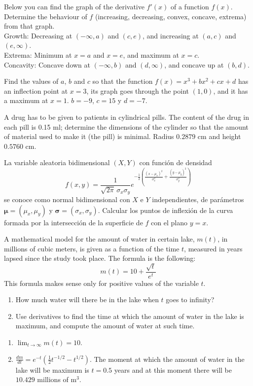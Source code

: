 
{ Below you can find the graph of the derivative $f'(x)$ of a function $f(x)$.
Determine the behaviour of $f$ (increasing, decreasing, convex, concave, extrema) from that graph.
\[

\]
}
{Growth: Decreasing at $(-\infty,a)$ and $(c,e)$, and increasing at $(a,c)$ and $(e,\infty)$.\\
Extrema: Minimum at $x=a$ and $x=e$, and maximum at $x=c$.\\
Concavity: Concave down at $(-\infty,b)$ and $(d,\infty)$, and concave up at $(b,d)$.
}
{
}

{Find the values of $a$, $b$ and $c$ so that the function $f(x)=x^3+bx^2+cx+d$ has an inflection point at $x=3$, its graph goes
through the point $(1,0)$, and it has a maximum at $x=1$.
}
{$b=-9$, $c=15$ y $d=-7$.
}
{
}

{A drug has to be given to patients in cylindrical pills.
The content of the drug in each pill is 0.15 ml; determine the dimensions of the cylinder so that the amount of material used to make it (the pill)
is minimal.
}
{Radius $0.2879$ cm and height $0.5760$ cm.
}
{
}


{La variable aleatoria bidimensional $(X,Y)$ con función de densidad
\[
f(x,y) = \frac{1}{\sqrt{2\pi}\, \sigma_x\sigma_y} e^{-\frac{1}{2}\left(\frac{(x-\mu_x)^2}{\sigma_x^2}+\frac{(y-\mu_y)^2}{\sigma_y^2}\right)}
\]
se conoce como normal bidimensional con $X$ e $Y$ independientes, de parámetros $\mathbf{\mu}=(\mu_x,\mu_y)$ y $\mathbf{\sigma}=(\sigma_x,\sigma_y)$.
Calcular los puntos de inflexión de la curva formada por la intersección de la superficie de $f$ con el plano $y=x$.
}


{A mathematical model for the amount of water in certain lake, $m(t)$, in millions of cubic meters, is given as a function of the time
$t$, measured in years lapsed since the study took place.
The formula is the following:
\[
m(t) = 10 + \frac{{\sqrt t }} {{e^t }}
\]
This formula makes sense only for positive values of the variable $t$.
\begin{enumerate}
\item How much water will there be in the lake when $t$ goes to infinity?
\item Use derivatives to find the time at which the amount of water in the lake is maximum, and compute the amount of water at such time.
\end{enumerate}
}
{\begin{enumerate}
\item $\lim_{t\rightarrow \infty}m(t) = 10$.
\item $\frac{dm}{dt}=e^{-t}(\frac{1}{2}t^{-1/2}-t^{1/2})$. The moment at which the amount of water in the lake will be maximum is $t=0.5$ years and at this moment there will be $10.429$ millions of m$^3$.
\end{enumerate}
}
{
}


